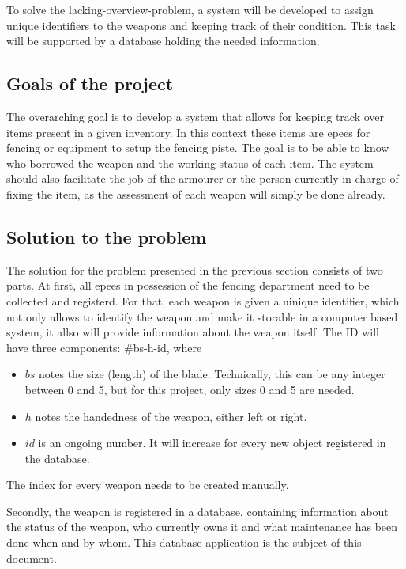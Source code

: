 To solve the lacking-overview-problem, a system will be developed to assign unique identifiers to the weapons and keeping track of 
their condition. This task will be supported by a database holding the needed information.

\subsection{Goals of the project}\label{sec:goals_of_the_project}
The overarching goal is to develop a system that allows for keeping track over items present in a given inventory. In this context
these items are epees for fencing or equipment to setup the fencing piste. The goal is to be able to know who borrowed the weapon
and the working status of each item. The system should also facilitate the job of the armourer or the person currently in charge
of fixing the item, as the assessment of each weapon will simply be done already.

\subsection{Solution to the problem}\label{sec:problem_solution}
The solution for the problem presented in the previous section consists of two parts. At first, all epees in possession of the 
fencing department need to be collected and registerd. For that, each weapon is given a uinique identifier, which not only allows
to identify the weapon and make it storable in a computer based system, it allso will provide information about the weapon itself.
The ID will have three components: \#bs-h-id, where

\begin{itemize}
    \item $bs$ notes the size (length) of the blade. Technically, this can be any integer between 0 and 5, but for this
        project, only sizes 0 and 5 are needed.
    \item $h$ notes the handedness of the weapon, either left or right.
    \item $id$ is an ongoing number. It will increase for every new object registered in the database.
\end{itemize}

The index for every weapon needs to be created manually.

Secondly, the weapon is registered in a database, containing information about the status of the weapon, who currently owns it and
what maintenance has been done when and by whom. This database application is the subject of this document.

